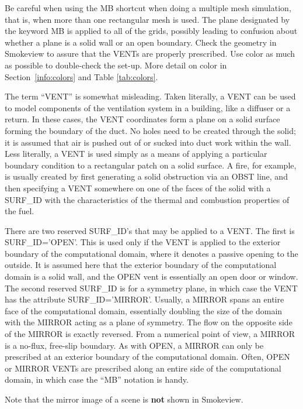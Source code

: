 \documentclass[11pt]{book}
\begin{document}
Be careful when using the {\ct MB} shortcut when doing a multiple mesh
simulation, that is, when more than one rectangular mesh is used. The
plane designated by the keyword {\ct MB} is applied to all of the
grids, possibly leading to confusion about whether a plane is a solid
wall or an open boundary. Check the geometry in Smokeview to assure that
the {\ct VENT}s are properly prescribed. Use color as much as
possible to double-check the set-up.  More detail on color in
Section~\ref{info:colors} and Table \ref{tab:colors}.

The term ``{\ct VENT}'' is somewhat misleading. Taken literally, a
{\ct VENT} can be used to model components of the ventilation system in
a building, like a diffuser or a return.
In these cases, the {\ct VENT} coordinates form a plane on a
solid surface forming the boundary of the duct.
No holes need to be created through the solid; it is
assumed that air is pushed out of or sucked into duct work within the
wall. Less literally, a {\ct VENT} is used simply as a means of applying
a particular boundary condition to a rectangular patch on a solid surface.
A fire, for example, is usually created by first generating a solid
obstruction via an {\ct OBST} line, and then specifying a {\ct VENT}
somewhere on one of the faces of the solid with a {\ct SURF\_ID}
with the characteristics of the thermal and combustion properties of the fuel.

There are two reserved {\ct SURF\_ID}'s that may be applied to a {\ct VENT}.
The first is {\ct SURF\_ID='OPEN'}. This is used only if the {\ct VENT}
is applied to the exterior boundary of the computational domain, where
it denotes a passive opening to the outside. It is assumed here that
the exterior boundary of the computational domain is a solid wall, and
the {\ct OPEN} vent is essentially an open door or window.
The second reserved {\ct SURF\_ID} is for a symmetry plane, in which
case the {\ct VENT} has the attribute {\ct SURF\_ID='MIRROR'}.
Usually, a {\ct MIRROR} spans an entire face of the computational
domain, essentially doubling the size of the domain with the {\ct MIRROR}
acting as a plane of symmetry. The flow on the opposite side of the
{\ct MIRROR} is exactly reversed. From a numerical point of view,
a {\ct MIRROR} is a no-flux, free-slip boundary.
As with {\ct OPEN}, a {\ct MIRROR} can only be prescribed at an
exterior boundary of the computational domain.
Often, {\ct OPEN} or {\ct MIRROR} {\ct VENT}s are prescribed along an
entire side of the computational domain, in which case the ``{\ct MB}''
notation is handy.
\begin{warning}
\noindent
Note that the mirror image of a scene is {\bf not} shown in Smokeview.
\end{warning}
\end{document}

